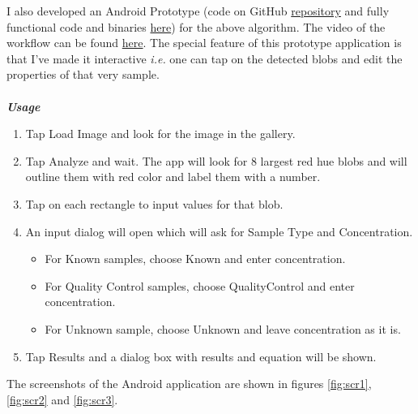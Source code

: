 \documentclass[runningheads,a4paper]{llncs}
\begin{document}
I also developed an Android Prototype (code on GitHub \href{https://github.com/abdulfatir/Blood-Analysis}{repository} and fully functional code and binaries \href{https://www.dropbox.com/sh/gge2q46ww5nw5zy/AABBIoVO_r9iy__i5pFRjzsMa?dl=0}{here}) for the above algorithm. The video of the workflow can be found \href{https://www.youtube.com/watch?v=ReJSvmJ23z0}{here}. The special feature of this prototype application is that I've made it interactive \emph{i.e.} one can tap on the detected blobs and edit the properties of that very sample.
\\ \\
\newpage
\emph{\textbf{Usage}}
\begin{enumerate}
\item Tap Load Image and look for the image in the gallery.
\item Tap Analyze and wait. The app will look for 8 largest red hue blobs and will outline them with red color and label them with a number.
\item Tap on each rectangle to input values for that blob.
\item An input dialog will open which will ask for Sample Type and Concentration.
\begin{itemize}
\item For Known samples, choose Known and enter concentration.
\item For Quality Control samples, choose QualityControl and enter concentration.
\item For Unknown sample, choose Unknown and leave concentration as it is.
\end{itemize}
\item Tap Results and a dialog box with results and equation will be shown.
\end{enumerate}

The screenshots of the Android application are shown in figures \ref{fig:scr1}, \ref{fig:scr2} and \ref{fig:scr3}.
\end{document}
